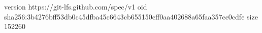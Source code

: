 version https://git-lfs.github.com/spec/v1
oid sha256:3b4276bff53db0c45dfba45c6643cb655150cff0aa402688a65faa357cc0cdfe
size 152260
